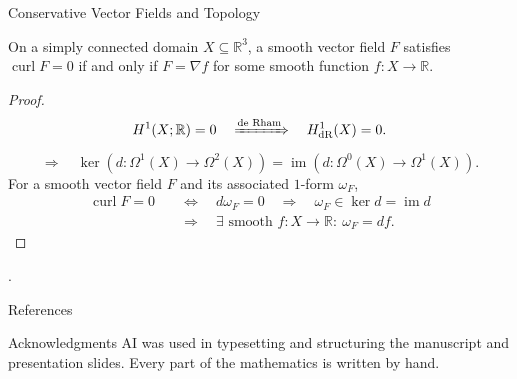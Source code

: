 \documentclass[aspectratio=169,11pt]{beamer}
\newcommand{\sources}[1]{\par\vfill{\scriptsize\color{black!75}#1\par}}
\begin{document}
\begin{frame}{Conservative Vector Fields and Topology}
  \begin{theorem}
    On a simply connected domain $X\subseteq\mathbb{R}^3$, a smooth vector
    field $F$ satisfies $\operatorname{curl}F=0$ if and only if $F=\nabla f$
    for some smooth function $f\colon X\to\mathbb{R}$.
  \end{theorem}
  \begin{proof}
  \setlength{\abovedisplayskip}{5pt}
  \setlength{\belowdisplayskip}{3pt}
  \begin{equation}
    H^1(X;\mathbb{R})=0
    \quad\xRightarrow{\text{de Rham}}\quad H^1_{\mathrm{dR}}(X)=0.
  \end{equation}
  \begin{equation}
    \Longrightarrow\quad
    \ker\!\left(d\colon\Omega^1(X)\to\Omega^2(X)\right)
    =\operatorname{im}\!\left(d\colon\Omega^0(X)\to\Omega^1(X)\right).
  \end{equation}
  For a smooth vector field $F$ and its associated $1$-form $\omega_F$,
  \begin{equation}
    \begin{aligned}
      \operatorname{curl}F=0 &\quad\Longleftrightarrow\quad d\omega_F=0
        \quad\Longrightarrow\quad \omega_F\in\ker d=\operatorname{im}d\\
        &\quad\Longrightarrow\quad
          \exists\text{ smooth }f\colon X\to\mathbb{R}:\ \omega_F=df.
    \end{aligned}
  \end{equation}
  \end{proof}
  \sources{\cite[Corollary~16.27, p.~421; p.~472; Problem~18-2, p.~487]{lee2013smooth}.}
\end{frame}

\begin{frame}{References}
  \scriptsize
  
  
\end{frame}

\begin{frame}[noframenumbering]{Acknowledgments}
  AI was used in typesetting and structuring the manuscript and presentation
  slides. Every part of the mathematics is written by hand.
\end{frame}
\end{document}
